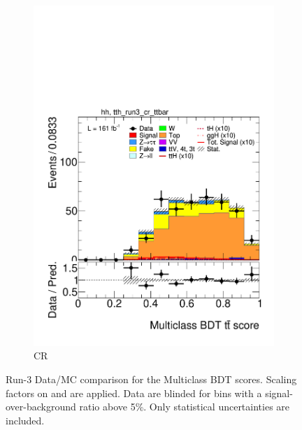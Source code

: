 \begin{figure}[htbp]
\begin{subfigure}[b]{0.49\textwidth}
  \end{subfigure}
  \hfill
  \begin{subfigure}[b]{0.49\textwidth}
    \centering
    \includegraphics[width=\textwidth]{images/plots_modelling_run2_run3_variables/run_3_tth/plot_tth_th_multiclass_ttbar_hh_tth_run3_cr_ttbar_22_23_24.pdf}
    \caption{\ttbar CR}

  \end{subfigure}

  \caption{Run-3 Data/MC comparison for the Multiclass BDT scores. Scaling factors on \ztautau and \ttbar are applied. Data are blinded for bins with a signal-over-background ratio above 5\%. Only statistical uncertainties are included.}
  \label{scores_modelling_3}
\end{figure}


